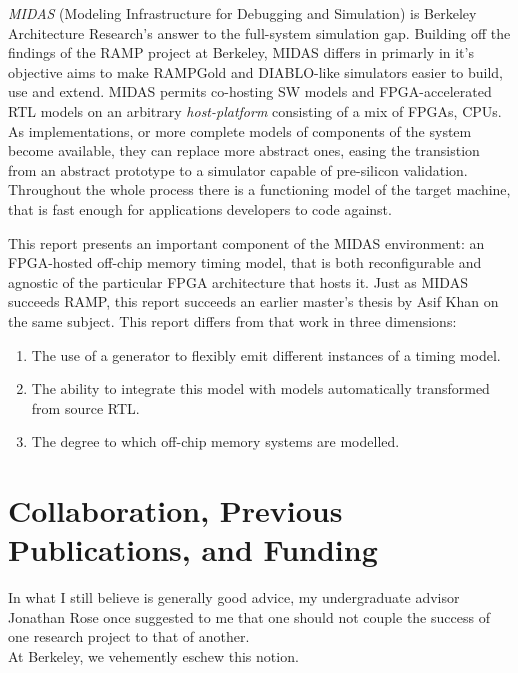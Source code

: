 \textit{MIDAS} (Modeling Infrastructure for Debugging and Simulation) is
Berkeley Architecture Research's answer to the full-system simulation gap.
Building off the findings of the RAMP\cite{ramp} project at Berkeley, MIDAS
differs in primarly in it's objective aims to make  RAMPGold\cite{rampgold} and
DIABLO\cite{diablo}-like simulators easier to build, use and extend. MIDAS
permits co-hosting SW models and FPGA-accelerated RTL models on an arbitrary
\textit{host-platform} consisting of a mix of FPGAs, CPUs. As implementations,
or more complete models of components of the system become available, they can
replace more abstract ones, easing the transistion from an abstract prototype
to a simulator capable of pre-silicon validation. Throughout the whole process
there is a functioning model of the target machine, that is fast enough for
applications developers to code against.

This report presents an important component of the MIDAS environment: an
FPGA-hosted off-chip memory timing model, that is both reconfigurable and
agnostic of the particular FPGA architecture that hosts it. Just as MIDAS
succeeds RAMP, this report succeeds an earlier master's thesis by Asif
Khan\cite{khanmasters} on the same subject. This report differs from that work
in three dimensions:

\begin{enumerate}
    \item The use of a generator to flexibly emit different instances of a timing model.
    \item The ability to integrate this model with models automatically transformed from source RTL.
    \item The degree to which off-chip memory systems are modelled.
\end{enumerate}

\section{Collaboration, Previous Publications, and Funding}

In what I still believe is generally good advice, my undergraduate advisor
Jonathan Rose once suggested to me that one should not couple the success of
one research project to that of another.\\

At Berkeley, we vehemently eschew this notion.\\

